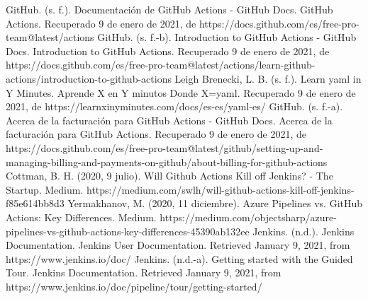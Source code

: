 \documentclass[twoside,twocolumn]{article}
\begin{document}
\begin{thebibliography}{99} 

\bibitem[1]{}
\newblock GitHub. (s. f.). Documentación de GitHub Actions - GitHub Docs. GitHub Actions. Recuperado 9 de enero de 2021, de https://docs.github.com/es/free-pro-team@latest/actions
\bibitem[2]{}
\newblock GitHub. (s. f.-b). Introduction to GitHub Actions - GitHub Docs. Introduction to GitHub Actions. Recuperado 9 de enero de 2021, de https://docs.github.com/es/free-pro-team@latest/actions/learn-github-actions/introduction-to-github-actions
\bibitem[3]{}
\newblock Leigh Brenecki, L. B. (s. f.). Learn yaml in Y Minutes. Aprende X en Y minutos Donde X=yaml. Recuperado 9 de enero de 2021, de https://learnxinyminutes.com/docs/es-es/yaml-es/
\bibitem[4]{}
\newblock GitHub. (s. f.-a). Acerca de la facturación para GitHub Actions - GitHub Docs. Acerca de la facturación para GitHub Actions. Recuperado 9 de enero de 2021, de https://docs.github.com/es/free-pro-team@latest/github/setting-up-and-managing-billing-and-payments-on-github/about-billing-for-github-actions
\bibitem[5]{}
\newblock Cottman, B. H. (2020, 9 julio). Will Github Actions Kill off Jenkins? - The Startup. Medium. https://medium.com/swlh/will-github-actions-kill-off-jenkins-f85e614bb8d3
\bibitem[6]{}
\newblock Yermakhanov, M. (2020, 11 diciembre). Azure Pipelines vs. GitHub Actions: Key Differences. Medium. https://medium.com/objectsharp/azure-pipelines-vs-github-actions-key-differences-45390ab132ee
\bibitem[7]{}
\newblock Jenkins. (n.d.). Jenkins Documentation. Jenkins User Documentation. Retrieved January 9, 2021, from https://www.jenkins.io/doc/
\bibitem[8]{}
\newblock Jenkins. (n.d.-a). Getting started with the Guided Tour. Jenkins Documentation. Retrieved January 9, 2021, from https://www.jenkins.io/doc/pipeline/tour/getting-started/

\end{thebibliography}


\end{document}
